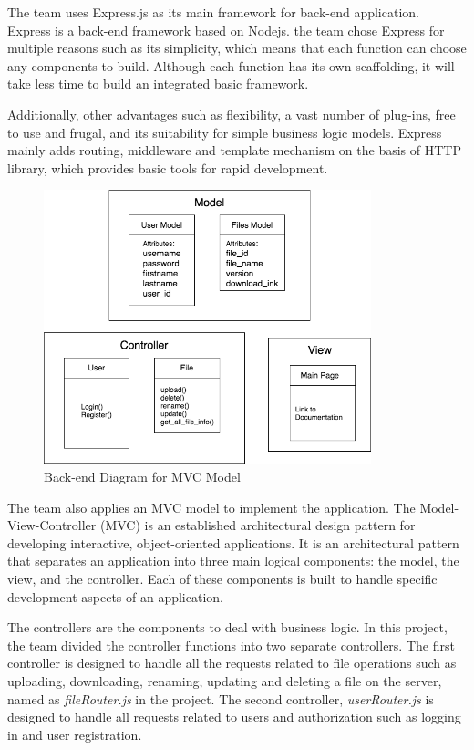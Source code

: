 \documentclass{article}
\begin{document}
The team uses Express.js as its main framework for back-end application. Express is a back-end framework based on Nodejs. the team chose Express for multiple reasons such as its simplicity, which means that each function can choose any components to build. Although each function has its own scaffolding, it will take less time to build an integrated basic framework.

Additionally, other advantages such as flexibility, a vast number of plug-ins, free to use and frugal, and its suitability for simple business logic models.  Express mainly adds routing, middleware and template mechanism on the basis of HTTP library, which provides basic tools for rapid development.
\begin{figure}[H]
\begin{center}
\includegraphics[width=9.5cm]{Backend_Diagram_MVC.png}
\end{center}
\caption{Back-end Diagram for MVC Model}\label{ex4}
\end{figure}
The team also applies an MVC model to implement the application. The Model-View-Controller (MVC)  is an established architectural design pattern for developing interactive, object-oriented applications. It is an architectural pattern that separates an application into three main logical components: the model, the view, and the controller. Each of these components is built to handle specific development aspects of an application.\cite{c6}

The controllers are the components to deal with business logic. In this project, the team divided the controller functions into two separate controllers. The first controller is designed to handle all the requests related to file operations such as uploading, downloading, renaming, updating and deleting a file on the server, named as \emph{fileRouter.js} in the project. The second controller, \emph{userRouter.js} is designed to handle all requests related to users and authorization such as logging in and user registration. 
\end{document}
